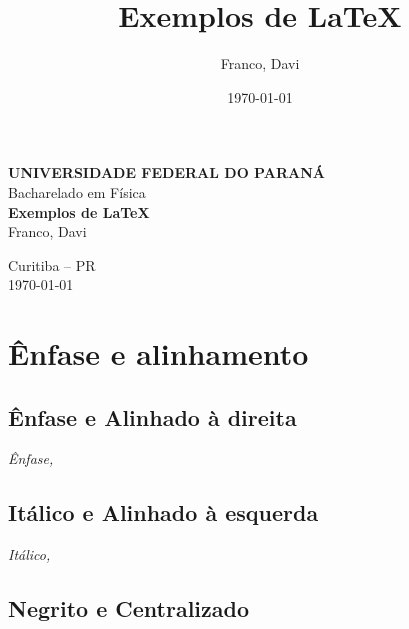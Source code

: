 \documentclass[twoside]{article}
\title{Exemplos de \LaTeX{}}
\author{Franco, Davi}
\date{\today}
\begin{document}
	
	\begin{titlepage}
		\BgThispage
		\begin{center}
			\vspace*{2cm}
			
			{\Large \textbf{UNIVERSIDADE FEDERAL DO PARANÁ}}\\[0.5cm]
			{\large Bacharelado em Física}\\[3cm]
			
			{\Huge \textbf{Exemplos de \LaTeX{}}}\\[2cm]
			
			{\Large Franco, Davi}\\[0.5cm]
			\vfill
			
			{\large Curitiba – PR\\
			\today}
		\end{center}
	\end{titlepage}
	

	\maketitle
	\newpage
	
	\tableofcontents
	\newpage
	
	\section{Ênfase e alinhamento}
	
	\subsection{Ênfase e Alinhado à direita}
	
	\begin{flushright}
		\emph{Ênfase, \lipsum[1]}
	\end{flushright}
	
	\subsection{Itálico e Alinhado à esquerda}
	
	\begin{flushleft}
		\textit{Itálico, \lipsum[2]}
	\end{flushleft}

	\subsection{Negrito e Centralizado}
	
\end{document}
